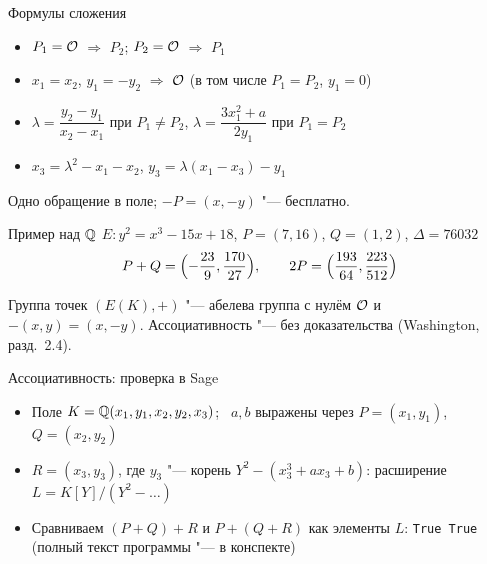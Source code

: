 \documentclass{ca-slides}
\begin{document}
\begin{canvasframe}{Формулы сложения}
  \begin{algorithm}[$P_1 + P_2$]
    \begin{itemize}
      \item $P_1 = \mathcal{O}$ $\Rightarrow$ $P_2$; \quad $P_2 = \mathcal{O}$ $\Rightarrow$ $P_1$
      \item $x_1 = x_2$, $y_1 = -y_2$ $\Rightarrow$ $\mathcal{O}$ \quad (в том числе $P_1 = P_2$, $y_1 = 0$)
      \item $\lambda = \dfrac{y_2 - y_1}{x_2 - x_1}$ при $P_1 \ne P_2$, \qquad
        $\lambda = \dfrac{3x_1^2 + a}{2y_1}$ при $P_1 = P_2$
      \item $x_3 = \lambda^2 - x_1 - x_2$, \qquad $y_3 = \lambda(x_1 - x_3) - y_1$
    \end{itemize}
  \end{algorithm}
  Одно обращение в поле; $-P = (x, -y)$ "--- бесплатно.
  \penspace[0.15\textheight]
\end{canvasframe}

\begin{canvasframe}{Пример над $\mathbb{Q}$}
  $E\colon y^2 = x^3 - 15x + 18$, \quad $P = (7, 16)$, \quad $Q = (1, 2)$, \quad $\Delta = 76032$
  \penspace[0.35\textheight]
  \[ P + Q = \Bigl(-\frac{23}{9}, \frac{170}{27}\Bigr), \qquad 2P = \Bigl(\frac{193}{64}, \frac{223}{512}\Bigr) \]
\end{canvasframe}

\begin{theoremframe}{Группа точек}
  $(E(K), +)$ "--- абелева группа с нулём $\mathcal{O}$ и $-(x, y) = (x, -y)$.
  Ассоциативность "--- без доказательства (Washington, разд.~2.4).
\end{theoremframe}

\begin{canvasframe}{Ассоциативность: проверка в Sage}
  \begin{itemize}
    \item Поле $K = \mathbb{Q}(x_1, y_1, x_2, y_2, x_3)$; \ $a, b$ выражены через $P = (x_1, y_1)$,
      $Q = (x_2, y_2)$
    \item $R = (x_3, y_3)$, где $y_3$ "--- корень $Y^2 - (x_3^3 + a x_3 + b)$: расширение
      $L = K[Y]/(Y^2 - \dots)$
    \item Сравниваем $(P + Q) + R$ и $P + (Q + R)$ как элементы $L$: \texttt{True True}
      (полный текст программы "--- в конспекте)
  \end{itemize}
  \penspace[0.2\textheight]
\end{canvasframe}
\end{document}
